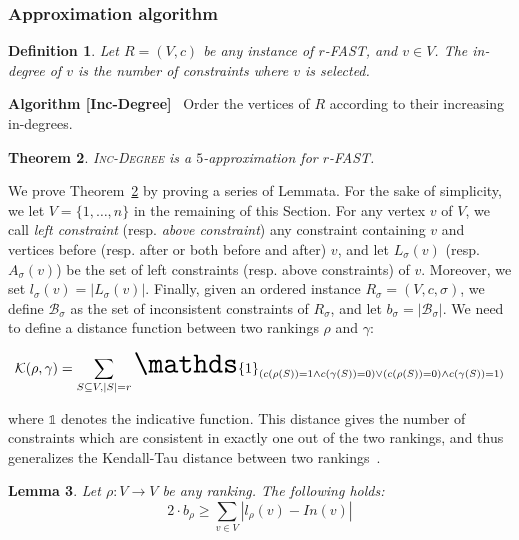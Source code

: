 \documentclass[11pt]{article}
\newtheorem{theorem}{Theorem}[section]
\newtheorem{definition}[theorem]{Definition}
\newtheorem{lemma}[theorem]{Lemma}
\begin{document}
\subsubsection{Approximation algorithm}

\begin{definition}
\label{def:indegree}
	Let $R = (V, c)$ be any instance of {\sc $r$-FAST}, and $v \in V$. The \emph{in-degree} of $v$ is the number of constraints where $v$ is selected.
\end{definition}

\noindent \textbf{Algorithm [{\sc Inc-Degree}]}~ Order the vertices of $R$ according to their increasing in-degrees.

\begin{theorem}
\label{thm:approx}
\textsc{Inc-Degree} is a $5$-approximation for {\sc $r$-FAST}.
\end{theorem}

We prove Theorem~\ref{thm:approx} by proving a series of Lemmata. 
For the sake of simplicity, we let $V = \{1, \ldots, n\}$ in the remaining of this Section. For any vertex $v$ of $V$, we call \emph{left constraint} (resp. \emph{above constraint}) any constraint containing $v$ and vertices before (resp. after or both before and after) $v$, and let $L_\sigma(v)$ (resp. $A_\sigma(v)$) be the set of left constraints (resp. above constraints) of $v$. Moreover, we set $l_\sigma(v) = |L_\sigma(v)|$. Finally, given an ordered instance 
$R_\sigma = (V, c, \sigma)$, we define $\mathcal{B}_\sigma$ as the set of inconsistent constraints of $R_\sigma$, and let $b_\sigma = |\mathcal{B}_\sigma|$. 
We need to define a distance function between two rankings $\rho$ and $\gamma$:

\begin{eqnarray*}
	\huge \mathcal{K}(\rho,\gamma) = \displaystyle\sum_{S \subseteq V, |S| = r} \mathds{1}_{(c(\rho(S)) = 1 \land c(\gamma(S)) = 0) \lor (c(\rho(S)) = 0) \land c(\gamma(S)) = 1)}
\end{eqnarray*}

where $\mathds{1}$ denotes the indicative function. This distance gives the number of constraints which are consistent in exactly one out of the two rankings, and thus generalizes the Kendall-Tau distance between two rankings~\cite{CFR06}.

\begin{lemma}
\label{lem:approxone}
Let $\rho : V \rightarrow V$ be any ranking. The following holds:
$$2 \cdot b_\rho \geqslant \displaystyle\sum_{v \in V} |l_\rho(v) - In(v)|$$
\end{lemma}
\end{document}
